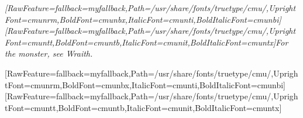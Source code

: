 \documentclass[fontsize=11pt,paper=A4,BCOR=12mm,DIV=13,open=any,listof=totoc,toc=flat]{scrbook}
\begin{document}
\allowdisplaybreaks
\raggedbottom
\thispagestyle{empty}
\pagestyle{empty}
%

{}
\maketitle
\pagestyle{scrheadings}

\setcounter{tocdepth}{\mytocdepth}
\tableofcontents 

{}

%

\label{0}
\begin{myquote}
\item{}{\itshape \allowbreak{}\setmainfont{cmunti.ttf}[RawFeature={fallback=myfallback},Path=/usr/share/fonts/truetype/cmu/,UprightFont=cmunrm,BoldFont=cmunbx,ItalicFont=cmunti,BoldItalicFont=cmunbi]\setmonofont{cmunti.ttf}[RawFeature={fallback=myfallback},Path=/usr/share/fonts/truetype/cmu/,UprightFont=cmuntt,BoldFont=cmuntb,ItalicFont=cmunit,BoldItalicFont=cmuntx]\itshape For the monster, see Wraith\footnotemark[1].}
\end{myquote}
\allowbreak{}\setmainfont{cmunrm.ttf}[RawFeature={fallback=myfallback},Path=/usr/share/fonts/truetype/cmu/,UprightFont=cmunrm,BoldFont=cmunbx,ItalicFont=cmunti,BoldItalicFont=cmunbi]\setmonofont{cmunrm.ttf}[RawFeature={fallback=myfallback},Path=/usr/share/fonts/truetype/cmu/,UprightFont=cmuntt,BoldFont=cmuntb,ItalicFont=cmunit,BoldItalicFont=cmuntx]
\end{document}
